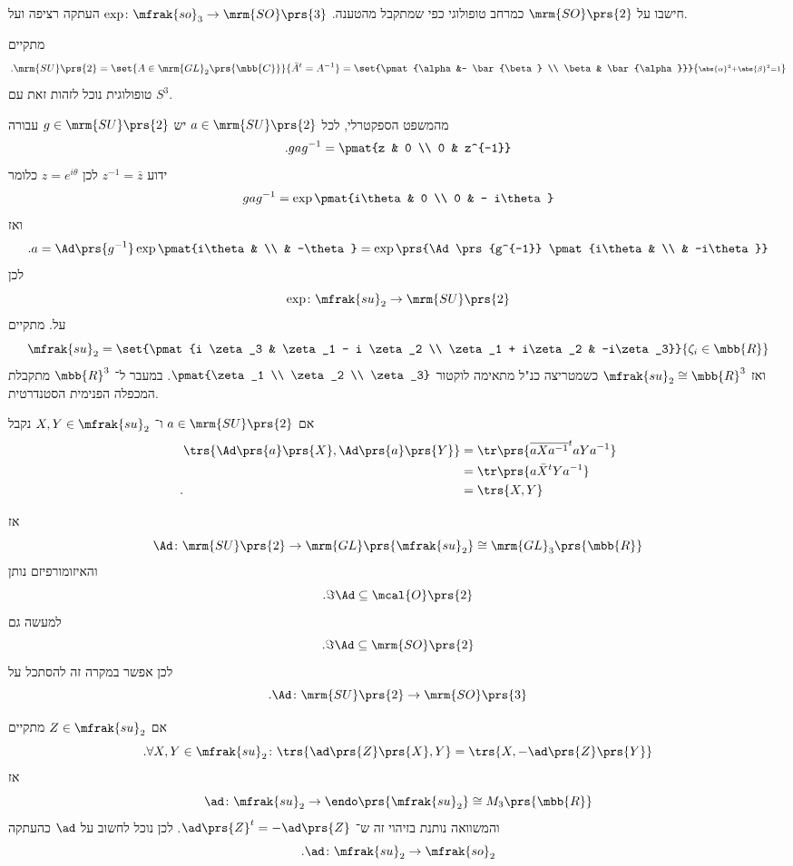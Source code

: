 \documentclass[10pt, twoside]{book}
\begin{document}
\begin{exercise}
חישבו על
$\mrm{SO}\prs{2}$
כמרחב טופולוגי כפי שמתקבל מהטענה.
$\exp \colon \mfrak{so}_3 \to \mrm{SO}\prs{3}$
העתקה רציפה ועל.
\end{exercise}

\begin{example}
מתקיים
\[\text{.} \mrm{SU}\prs{2} = \set{A \in \mrm{GL}_2\prs{\mbb{C}}}{\bar{A}^t = A^{-1}} = \set{\pmat{\alpha &- \bar{\beta} \\ \beta & \bar{\alpha}}}{\substack{\abs{\alpha}^2 + \abs{\beta}^2 = 1}}\]
טופולוגית נוכל לזהות זאת עם
$S^3$.

מהמשפט הספקטרלי, לכל
$a \in \mrm{SU}\prs{2}$
יש
$g \in \mrm{SU}\prs{2}$
עבורה
\[\text{.} g a g^{-1} = \pmat{z & 0 \\ 0 & z^{-1}}\]
ידוע
$z^{-1} = \bar{z}$
לכן
$z = e^{i\theta}$
כלומר
\[g a g^{-1} = \exp \pmat{i\theta & 0 \\ 0 & - i\theta}\]
ואז
\[\text{.} a = \Ad\prs{g^{-1}}\exp\pmat{i\theta & \\ & -\theta} = \exp\prs{\Ad\prs{g^{-1}} \pmat{i\theta & \\ & -i\theta}}\]
לכן
\[\exp \colon \mfrak{su}_2 \to \mrm{SU}\prs{2}\]
על.
מתקיים
\[\mfrak{su}_2 = \set{\pmat{i \zeta_3 & \zeta_1 - i \zeta_2 \\ \zeta_1 + i\zeta_2 & -i\zeta_3}}{\zeta_i \in \mbb{R}}\]
ואז
$\mfrak{su}_2 \cong \mbb{R}^3$
כשמטריצה כנ"ל מתאימה לוקטור
$\pmat{\zeta_1 \\ \zeta_2 \\ \zeta_3}$.
במעבר ל־%
$\mbb{R}^3$
מתקבלת המכפלה הפנימית הסטנדרטית.

אם
$a \in \mrm{SU}\prs{2}$
ו־%
$X,Y \in \mfrak{su}_2$
נקבל
\begin{align*}
\trs{\Ad\prs{a}\prs{X}, \Ad\prs{a}\prs{Y}} &=
\tr\prs{\overline{aX a^{-1}}^t a Y a^{-1}}
\\&=
\tr\prs{a \bar{X}^t Y a^{-1}}
\\\text{.} \hphantom{\trs{\Ad\prs{a}\prs{X}, \Ad\prs{a}\prs{Y}}} &= \trs{X,Y}
\end{align*}

אז
\[\Ad \colon \mrm{SU}\prs{2} \to \mrm{GL}\prs{\mfrak{su}_2} \cong \mrm{GL}_3\prs{\mbb{R}}\]
והאיזומורפיזם נותן
\[\text{.} \Im \Ad \subseteq \mcal{O}\prs{2}\]
למעשה גם
\[\text{.} \Im \Ad \subseteq \mrm{SO}\prs{2}\]
לכן אפשר במקרה זה להסתכל על
\[\text{.} \Ad \colon \mrm{SU}\prs{2} \to \mrm{SO}\prs{3}\]

אם
$Z \in \mfrak{su}_2$
מתקיים
\[\text{.} \forall X,Y \in \mfrak{su}_2 \colon \trs{\ad\prs{Z}\prs{X}, Y} = \trs{X, -\ad\prs{Z}\prs{Y}}\]
אז
\[\ad \colon \mfrak{su}_2 \to \endo\prs{\mfrak{su}_2} \cong M_3\prs{\mbb{R}}\]
והמשוואה נותנת בזיהוי זה ש־%
$\ad\prs{Z}^t = - \ad\prs{Z}$.
לכן נוכל לחשוב על
$\ad$
כהעתקה
\[\text{.} \ad \colon \mfrak{su}_2 \to \mfrak{so}_2\]
\end{example}
\end{document}
